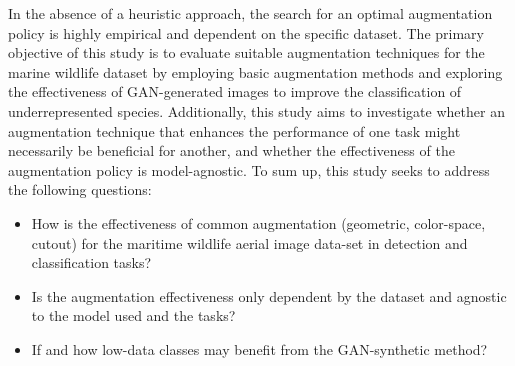 In the absence of a heuristic approach, the search for an optimal augmentation policy is highly empirical and dependent on the specific dataset. The primary objective of this study is to evaluate suitable augmentation techniques for the marine wildlife dataset by employing basic augmentation methods and exploring the effectiveness of GAN-generated images to improve the classification of underrepresented species.  Additionally, this study aims to investigate whether an augmentation technique that enhances the performance of one task might necessarily be beneficial for another, and whether the effectiveness of the augmentation policy is model-agnostic. To sum up, this study seeks to address the following questions:

\begin{itemize}
\item How is the effectiveness of common augmentation (geometric, color-space, cutout) for the maritime wildlife aerial image data-set in detection and classification tasks?
\item Is the augmentation effectiveness only dependent by the dataset and agnostic to the model used and the tasks?
\item If and how low-data classes may benefit from the GAN-synthetic method?
\end{itemize}
